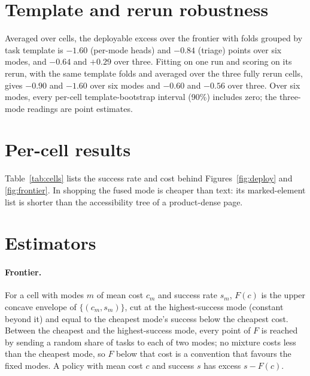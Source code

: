 


\section{Template and rerun robustness}\label{app:robust}

Averaged over cells, the deployable excess over the frontier with folds grouped by task template is $-1.60$ (per-mode heads) and $-0.84$ (triage) points over six modes, and $-0.64$ and $+0.29$ over three. Fitting on one run and scoring on its rerun, with the same template folds and averaged over the three fully rerun cells, gives $-0.90$ and $-1.60$ over six modes and $-0.60$ and $-0.56$ over three. Over six modes, every per-cell template-bootstrap interval (90\%) includes zero; the three-mode readings are point estimates. %

\section{Per-cell results}\label{app:cells}



Table~\ref{tab:cells} lists the success rate and cost behind Figures~\ref{fig:deploy} and \ref{fig:frontier}. In shopping the fused mode is cheaper than text: its marked-element list is shorter than the accessibility tree of a product-dense page.

\section{Estimators}\label{app:estimators}

\paragraph{Frontier.} For a cell with modes $m$ of mean cost $c_m$ and success rate $s_m$, $F(c)$ is the upper concave envelope of $\{(c_m, s_m)\}$, cut at the highest-success mode (constant beyond it) and equal to the cheapest mode's success below the cheapest cost. Between the cheapest and the highest-success mode, every point of $F$ is reached by sending a random share of tasks to each of two modes; no mixture costs less than the cheapest mode, so $F$ below that cost is a convention that favours the fixed modes. A policy with mean cost $c$ and success $s$ has excess $s - F(c)$.

